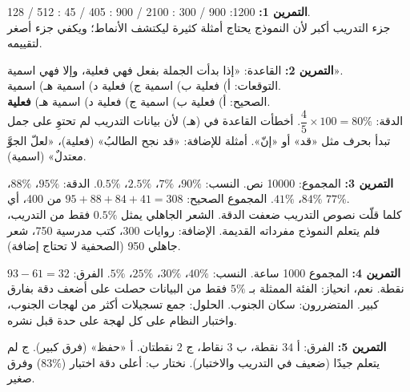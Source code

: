\documentclass[a4paper]{article}
\begin{document}
\newpage
{}

\textbf{التمرين 1:}
1200: 900 / 300 : 2100 / 900 : 405 / 45 : 512 / 128.\\
جزء التدريب أكبر لأن النموذج يحتاج أمثلة كثيرة ليكتشف الأنماط؛ ويكفي جزء أصغر لتقييمه.

\textbf{التمرين 2:}
القاعدة: «إذا بدأت الجملة بفعل فهي فعلية، وإلا فهي اسمية».\\
التوقعات: أ) فعلية \quad ب) اسمية \quad ج) فعلية \quad د) اسمية \quad هـ) اسمية.\\
الصحيح: أ) فعلية \quad ب) اسمية \quad ج) فعلية \quad د) اسمية \quad هـ) \textbf{فعلية}.\\
الدقة: $\dfrac{4}{5}\times 100 = 80\%$.
أخطأت القاعدة في (هـ) لأن بيانات التدريب لم تحتوِ على جمل تبدأ بحرف مثل «قد» أو «إنّ».
أمثلة للإضافة: «قد نجح الطالبُ» (فعلية)، «لعلّ الجوَّ معتدلٌ» (اسمية).

\textbf{التمرين 3:}
المجموع: 10000 نص. النسب: $90\%$، $7\%$، $2.5\%$، $0.5\%$.
الدقة: $95\%$، $88\%$، $84\%$، $41\%$.
المجموع الصحيح: $95 + 88 + 84 + 41 = 308$ من 400، أي $77\%$.\\
كلما قلّت نصوص التدريب ضعفت الدقة. الشعر الجاهلي يمثل $0.5\%$ فقط من التدريب،
فلم يتعلم النموذج مفرداته القديمة.
الإضافة: روايات 300، كتب مدرسية 750، شعر جاهلي 950 (الصحفية لا تحتاج إضافة).

\textbf{التمرين 4:}
المجموع 1000 ساعة. النسب: $40\%$، $30\%$، $25\%$، $5\%$.
الفرق: $93 - 61 = 32$ نقطة.
نعم، انحياز: الفئة الممثلة بـ $5\%$ فقط من البيانات حصلت على أضعف دقة بفارق كبير.
المتضررون: سكان الجنوب. الحلول: جمع تسجيلات أكثر من لهجات الجنوب،
واختبار النظام على كل لهجة على حدة قبل نشره.

\textbf{التمرين 5:}
الفرق: أ $34$ نقطة، ب $3$ نقاط، ج $2$ نقطتان.
أ «حفظ» (فرق كبير). ج لم يتعلم جيدًا (ضعيف في التدريب والاختبار).
نختار ب: أعلى دقة اختبار ($83\%$) وفرق صغير.
\end{document}
